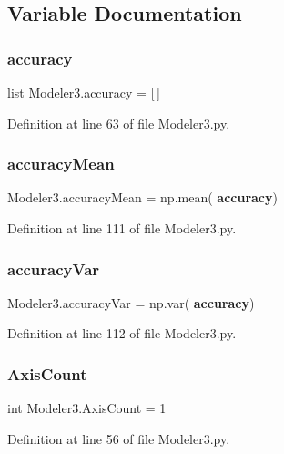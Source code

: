 \subsection{Variable Documentation}
\mbox{\label{namespace_modeler3_a9eaa650fb0f3f64a705b194dafe82503}} 
\subsubsection{accuracy}
{\footnotesize\ttfamily list Modeler3.\+accuracy = [$\,$]}



Definition at line 63 of file Modeler3.\+py.

\mbox{\label{namespace_modeler3_a44e13c8e4ee6e3dd9599a0fb42c72107}} 
\subsubsection{accuracy\+Mean}
{\footnotesize\ttfamily Modeler3.\+accuracy\+Mean = np.\+mean(\textbf{ accuracy})}



Definition at line 111 of file Modeler3.\+py.

\mbox{\label{namespace_modeler3_a90ecbdfcbed94f51411154bbb7810ec8}} 
\subsubsection{accuracy\+Var}
{\footnotesize\ttfamily Modeler3.\+accuracy\+Var = np.\+var(\textbf{ accuracy})}



Definition at line 112 of file Modeler3.\+py.

\mbox{\label{namespace_modeler3_a99c23c9ffb0736c25b07e9cd68776a58}} 
\subsubsection{Axis\+Count}
{\footnotesize\ttfamily int Modeler3.\+Axis\+Count = 1}



Definition at line 56 of file Modeler3.\+py.

